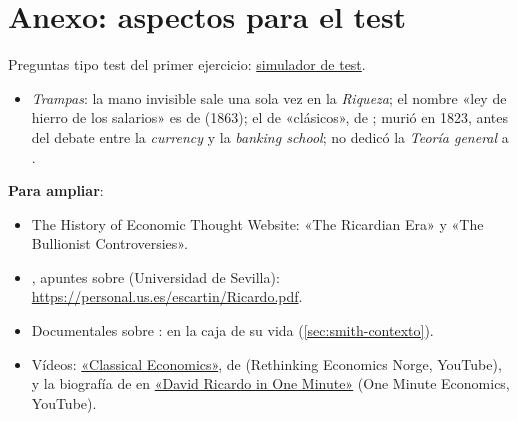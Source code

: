 \documentclass[11pt]{article}
\begin{document}
\section{Anexo: aspectos para el test}\label{anexo:test}

\begin{anotaciones}
Preguntas tipo test del primer ejercicio: \href{https://www.victorgutierrezmarcos.es/oposicion/temario/primer-ejercicio/test/simulador.html?tema=3.A.2}{simulador de test}.
\end{anotaciones}

\begin{itemize}
\item \emph{Trampas}: la mano invisible sale una sola vez en la \emph{Riqueza}; el nombre «ley de hierro de los salarios» es de  (1863); el de «clásicos», de ;  murió en 1823, antes del debate entre la \emph{currency} y la \emph{banking school};  no dedicó la \emph{Teoría general} a .
\end{itemize}

\begin{anotaciones}
\textbf{Para ampliar}:
\begin{itemize}
\item The History of Economic Thought Website: «The Ricardian Era» y «The Bullionist Controversies»\nocite{HET2026Ricardian,HET2026Bullion}.
\item {}, apuntes sobre  (Universidad de Sevilla): \url{https://personal.us.es/escartin/Ricardo.pdf}\nocite{Escartin2008Apuntes}.
\item Documentales sobre : en la caja de su vida (\ref{sec:smith-contexto}).
\item Vídeos: \href{https://www.youtube.com/watch?v=iXuW2KfVPF0}{«Classical Economics»}, de  (Rethinking Economics Norge, YouTube), y la biografía de  en \href{https://www.youtube.com/watch?v=s-38SNG6xnc}{«David Ricardo in One Minute»} (One Minute Economics, YouTube).
\end{itemize}
\end{anotaciones}

\bibliografia
\end{document}
